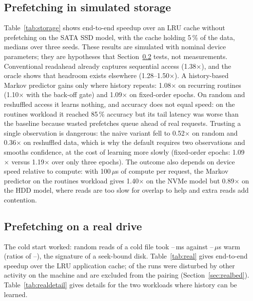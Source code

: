 \documentclass[conference]{IEEEtran}
\begin{document}
\subsection{Prefetching in simulated storage}\label{sec:storage}
Table~\ref{tab:storage} shows end-to-end speedup over an LRU cache without prefetching on the SATA SSD model, with the cache holding 5\,\% of the data, medians over three seeds. These results are simulated with nominal device parameters; they are hypotheses that Section~\ref{sec:real} tests, not measurements. Conventional readahead already captures sequential access (1.38$\times$), and the oracle shows that headroom exists elsewhere (1.28--1.50$\times$). A history-based Markov predictor gains only where history repeats: 1.08$\times$ on recurring routines (1.10$\times$ with the back-off gate) and 1.09$\times$ on fixed-order epochs. On random and reshuffled access it learns nothing, and accuracy does not equal speed: on the routines workload it reached 85\,\% accuracy but its tail latency was worse than the baseline because wasted prefetches queue ahead of real requests. Trusting a single observation is dangerous: the naive variant fell to 0.52$\times$ on random and 0.36$\times$ on reshuffled data, which is why the default requires two observations and smooths confidence, at the cost of learning more slowly (fixed-order epochs: 1.09$\times$ versus 1.19$\times$ over only three epochs). The outcome also depends on device speed relative to compute: with 100\,$\mu$s of compute per request, the Markov predictor on the routines workload gives 1.40$\times$ on the NVMe model but 0.89$\times$ on the HDD model, where reads are too slow for overlap to help and extra reads add contention.

\subsection{Prefetching on a real drive}\label{sec:real}
The cold start worked: random reads of a cold file took \realColdMsLo--\realColdMsHi\,ms against \realWarmUsLo--\realWarmUsHi\,$\mu$s warm (ratios of \realRatioLo--\realRatioHi), the signature of a seek-bound disk. Table~\ref{tab:real} gives end-to-end speedup over the LRU application cache; \realDisturbed{} of the \realRuns{} runs were disturbed by other activity on the machine and are excluded from the pairing (Section~\ref{sec:realbed}). Table~\ref{tab:realdetail} gives details for the two workloads where history can be learned.

\begin{table}[!t]
\caption{Measured speedup over the LRU application cache on a rotational drive, cold cache at every run (median of paired, undisturbed repeats; above 1 is faster). OS: kernel only, with readahead (RA) on or off; seq.: sequential prefetch; +gate: markov2 with the back-off gate. $^\ast$: fewer than three undisturbed pairs.}
\label{tab:real}
\centering\scriptsize
\setlength{\tabcolsep}{2.5pt}

\end{table}
\end{document}
